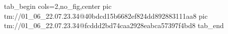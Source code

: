  
 
 
 
 

\qqSecOrig


\ifcmt
  tab_begin cols=2,no_fig,center
    pic tm://01_06_22.07.23.34@40bdcd15b6682ef824dd892883111aa8
    pic tm://01_06_22.07.23.34@fcddd2bd74caa2928eabca57397f4bd8
  tab_end
\fi

